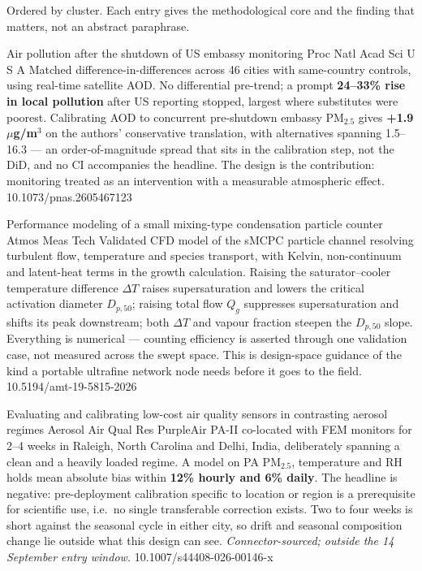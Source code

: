 \documentclass[10pt]{article}
\begin{document}
{\fontsize{7.4}{9}\selectfont\color{Slate}Ordered by cluster. Each entry gives the
methodological core and the finding that matters, not an abstract paraphrase.\par}


{Air pollution after the shutdown of US embassy monitoring}
{Proc Natl Acad Sci U S A}
{Matched difference-in-differences across 46 cities with same-country controls, using
real-time satellite AOD. No differential pre-trend; a prompt \textbf{24--33\% rise in
local pollution} after US reporting stopped, largest where substitutes were poorest.
Calibrating AOD to concurrent pre-shutdown embassy PM$_{2.5}$ gives \textbf{+1.9\,$\mu$g/m$^3$}
on the authors' conservative translation, with alternatives spanning 1.5--16.3 ---
an order-of-magnitude spread that sits in the calibration step, not the DiD, and no CI
accompanies the headline. The design is the contribution: monitoring treated as an
intervention with a measurable atmospheric effect.}
{10.1073/pnas.2605467123}

{Performance modeling of a small mixing-type condensation particle counter}
{Atmos Meas Tech}
{Validated CFD model of the sMCPC particle channel resolving turbulent flow, temperature
and species transport, with Kelvin, non-continuum and latent-heat terms in the growth
calculation. Raising the saturator--cooler temperature difference $\Delta T$ raises
supersaturation and lowers the critical activation diameter $D_{p,50}$; raising total flow
$Q_g$ suppresses supersaturation and shifts its peak downstream; both $\Delta T$ and
vapour fraction steepen the $D_{p,50}$ slope. Everything is numerical --- counting
efficiency is asserted through one validation case, not measured across the swept space.
This is design-space guidance of the kind a portable ultrafine network node needs
before it goes to the field.}
{10.5194/amt-19-5815-2026}

{Evaluating and calibrating low-cost air quality sensors in contrasting aerosol regimes}
{Aerosol Air Qual Res}
{PurpleAir PA-II co-located with FEM monitors for 2--4 weeks in Raleigh, North Carolina
and Delhi, India, deliberately spanning a clean and a heavily loaded regime. A model on
PA PM$_{2.5}$, temperature and RH holds mean absolute bias within \textbf{12\% hourly and
6\% daily}. The headline is negative: pre-deployment calibration specific to location or
region is a prerequisite for scientific use, i.e.\ no single transferable correction
exists. Two to four weeks is short against the seasonal cycle in either city, so drift
and seasonal composition change lie outside what this design can see.
\textit{Connector-sourced; outside the 14 September entry window.}}
{10.1007/s44408-026-00146-x}
\end{document}
